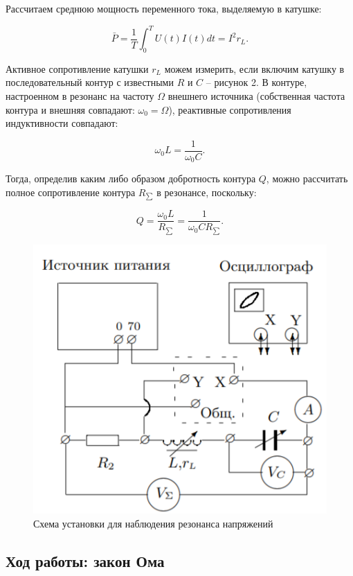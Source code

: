 \documentclass[a4paper, fontsize = 14pt]{article}
\begin{document}
Рассчитаем среднюю мощность переменного тока, выделяемую в катушке:

\begin{equation}
	\bar P = \frac{1}{T} \int_0^T U(t) I(t) dt = I^2 r_L. 
\end{equation}

Активное сопротивление катушки $r_L$ можем измерить, если включим катушку в последовательный контур с известными $R$ и $C$ -- рисунок 2. В контуре, настроенном в резонанс на частоту $\Omega$ внешнего источника (собственная частота контура и внешняя совпадают: $\omega_0 = \Omega$), реактивные сопротивления индуктивности совпадают:

\begin{equation}
	\omega_0 L = \frac{1}{\omega_0 C}. 
\end{equation}

Тогда, определив каким либо образом добротность контура $Q$, можно рассчитать полное сопротивление контура $R_{\sum}$ в резонансе, поскольку:

\begin{equation}
	Q = \frac{\omega_0 L}{R_{\sum}} = \frac{1}{\omega_0 C R_{
	\sum}}. 
\end{equation}

\begin{figure}[hbt]
	\centering
	\includegraphics[scale=0.8]{lab48ris2.png}
	\caption{Схема установки для наблюдения резонанса напряжений}
\end{figure}

\subsection*{Ход работы: закон Ома}
\end{document}
